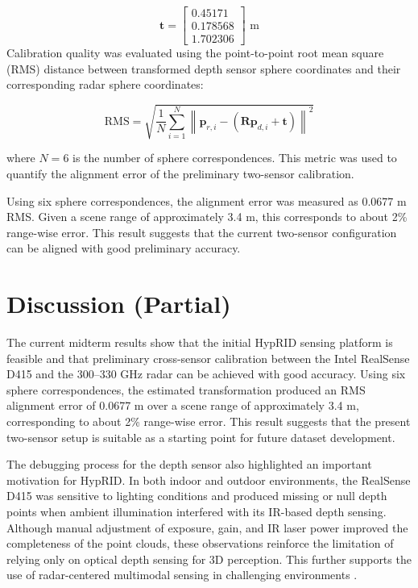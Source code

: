 \documentclass[conference]{IEEEtran}
\begin{document}
\begin{equation}
\mathbf{t} =
\begin{bmatrix}
0.45171 \\
0.178568 \\
1.702306
\end{bmatrix}
\text{ m}
\end{equation}
Calibration quality was evaluated using the point-to-point root mean square (RMS) distance between transformed depth sensor sphere coordinates and their corresponding radar sphere coordinates:

\begin{equation}
\mathrm{RMS} = \sqrt{\frac{1}{N}\sum_{i=1}^{N}\left\|\mathbf{p}_{r,i} - (\mathbf{R}\mathbf{p}_{d,i} + \mathbf{t})\right\|^2}
\end{equation}

where $N=6$ is the number of sphere correspondences. This metric was used to quantify the alignment error of the preliminary two-sensor calibration.

Using six sphere correspondences, the alignment error was measured as 0.0677 m RMS. Given a scene range of approximately 3.4 m, this corresponds to about 2\% range-wise error. This result suggests that the current two-sensor configuration can be aligned with good preliminary accuracy.








\section{Discussion (Partial)}

The current midterm results show that the initial HypRID sensing platform is feasible and that preliminary cross-sensor calibration between the Intel RealSense D415 and the 300--330 GHz radar can be achieved with good accuracy. Using six sphere correspondences, the estimated transformation produced an RMS alignment error of 0.0677 m over a scene range of approximately 3.4 m, corresponding to about 2\% range-wise error. This result suggests that the present two-sensor setup is suitable as a starting point for future dataset development.

The debugging process for the depth sensor also highlighted an important motivation for HypRID. In both indoor and outdoor environments, the RealSense D415 was sensitive to lighting conditions and produced missing or null depth points when ambient illumination interfered with its IR-based depth sensing. Although manual adjustment of exposure, gain, and IR laser power improved the completeness of the point clouds, these observations reinforce the limitation of relying only on optical depth sensing for 3D perception. This further supports the use of radar-centered multimodal sensing in challenging environments \cite{guan2020through,prabhakara2022exploring}.
\end{document}
